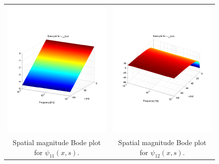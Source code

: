 \documentclass[preprint]{elsarticle}
\begin{document}
\begin{figure}
\begin{centering}
\begin{tabular}{cc}
\includegraphics[trim = 0mm 60mm 0mm 60mm, width = 8cm]{distr11_-3to-1}
&
\includegraphics[trim = 0mm 60mm 0mm 60mm, width = 8cm]{distr12_-3to-1}
\tabularnewline
Spatial magnitude Bode plot for $\psi_{11}(x,s)$.
&
Spatial magnitude Bode plot for $\psi_{12}(x,s)$.
\tabularnewline

\end{tabular}
\end{centering}
\end{figure}
\end{document}
